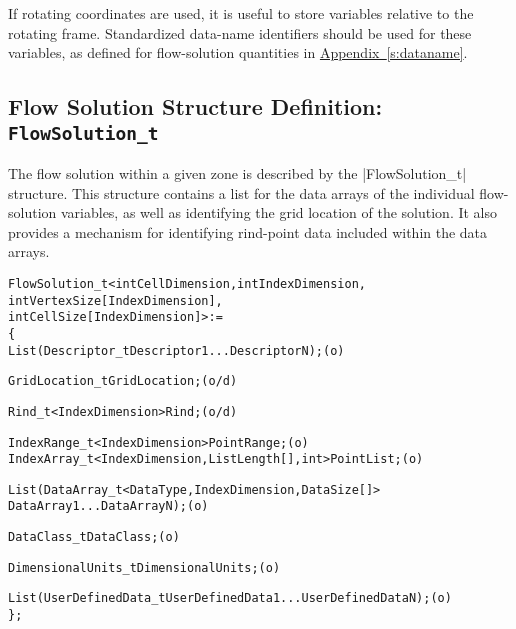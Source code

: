 If rotating coordinates are used, it is useful to store variables
relative to the rotating frame.
Standardized data-name identifiers should be used for these variables,
as defined for flow-solution quantities in
\hyperref[s:dataname]{Appendix~\ref*{s:dataname}}.

\subsection{Flow Solution Structure Definition: \texttt{FlowSolution\_t}} 
\label{s:FlowSolution}

The flow solution within a given zone is described by the |FlowSolution_t|
structure.  This structure contains a list for the data arrays of the
individual flow-solution variables, as well as identifying the grid location
of the solution.  It also provides a mechanism for identifying rind-point
data included within the data arrays.

\begin{alltt}
  FlowSolution\_t< int CellDimension, int IndexDimension, 
                  int VertexSize[IndexDimension], 
                  int CellSize[IndexDimension] > :=
    \{
    List( Descriptor\_t Descriptor1 ... DescriptorN ) ;                      (o)

    GridLocation\_t GridLocation ;                                           (o/d)

    Rind\_t<IndexDimension> Rind ;                                           (o/d)

    IndexRange\_t<IndexDimension> PointRange ;                               (o)
    IndexArray\_t<IndexDimension, ListLength[], int> PointList ;             (o)

    List( DataArray\_t<DataType, IndexDimension, DataSize[]> 
          DataArray1 ... DataArrayN ) ;                                     (o)

    DataClass\_t DataClass ;                                                 (o)
    
    DimensionalUnits\_t DimensionalUnits ;                                   (o)

    List( UserDefinedData\_t UserDefinedData1 ... UserDefinedDataN ) ;       (o)
    \} ;
\end{alltt}

